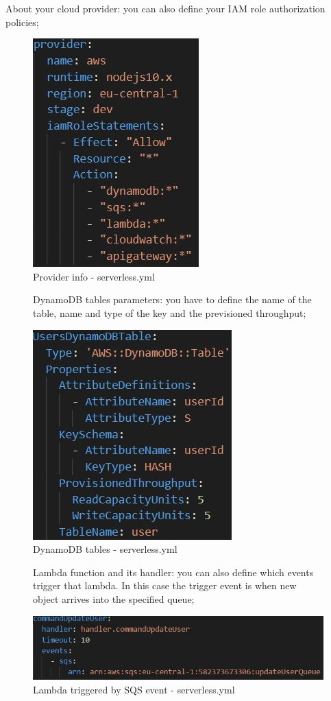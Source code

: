 About your cloud provider: you can also define your IAM role authorization policies;
\begin{figure} [H]
	\centering
	\includegraphics[scale=1.2]{../Img/serv2}
	\caption{Provider info - serverless.yml}\label{}
\end{figure}

\begin{figure} [H]
 DynamoDB tables parameters: you have to define the name of the table, name and type of the key and the previsioned throughput;

	\centering
	\includegraphics[scale=1.2]{../Img/serv3}
	\caption{DynamoDB tables - serverless.yml}\label{}
\end{figure}

\begin{figure} [H]
 Lambda function and its handler: you can also define which events trigger that lambda. In this case the trigger event is when new object arrives into the specified queue; 

	\centering
	\includegraphics[scale=1.2]{../Img/serv4}
	\caption{Lambda triggered by SQS event - serverless.yml}\label{}
\end{figure}

